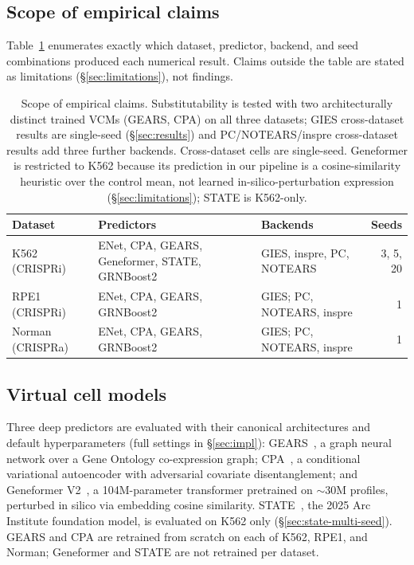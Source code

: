 \documentclass{article}
\theoremstyle{plain}
\theoremstyle{definition}
\theoremstyle{remark}
\begin{document}
\subsection{Scope of empirical claims}
\label{sec:scope}
Table~\ref{tab:scope} enumerates exactly which dataset, predictor, backend, and seed combinations produced each numerical result. Claims outside the table are stated as limitations (\S\ref{sec:limitations}), not findings.

\begin{table}[t]
\centering
\small
\begin{tabular}{l p{6.1cm} l r}
\toprule
\textbf{Dataset} & \textbf{Predictors} & \textbf{Backends} & \textbf{Seeds} \\
\midrule
K562 (CRISPRi)   & ENet, CPA, GEARS, Geneformer, STATE, GRNBoost2 & GIES, inspre, PC, NOTEARS & 3, 5, 20 \\
RPE1 (CRISPRi)   & ENet, CPA, GEARS, GRNBoost2                    & GIES; PC, NOTEARS, inspre & 1 \\
Norman (CRISPRa) & ENet, CPA, GEARS, GRNBoost2                    & GIES; PC, NOTEARS, inspre & 1 \\
\bottomrule
\end{tabular}
\caption{Scope of empirical claims. Substitutability is tested with two architecturally distinct trained VCMs (GEARS, CPA) on all three datasets; GIES cross-dataset results are single-seed (\S\ref{sec:results}) and PC/NOTEARS/inspre cross-dataset results add three further backends. Cross-dataset cells are single-seed. Geneformer is restricted to K562 because its prediction in our pipeline is a cosine-similarity heuristic over the control mean, not learned in-silico-perturbation expression (\S\ref{sec:limitations}); STATE is K562-only.}
\label{tab:scope}
\end{table}

\subsection{Virtual cell models}
Three deep predictors are evaluated with their canonical architectures and default hyperparameters (full settings in \S\ref{sec:impl}): GEARS~\citep{roohani2024gears}, a graph neural network over a Gene Ontology co-expression graph; CPA~\citep{lotfollahi2023cpa}, a conditional variational autoencoder with adversarial covariate disentanglement; and Geneformer V2~\citep{theodoris2023geneformer}, a 104M-parameter transformer pretrained on $\sim$30M profiles, perturbed in silico via embedding cosine similarity. STATE~\citep{adduri2025state,arc2025state}, the 2025 Arc Institute foundation model, is evaluated on K562 only (\S\ref{sec:state-multi-seed}). GEARS and CPA are retrained from scratch on each of K562, RPE1, and Norman; Geneformer and STATE are not retrained per dataset.
\end{document}

